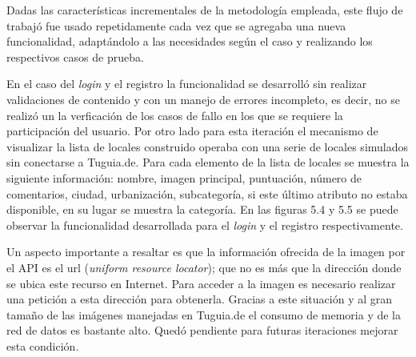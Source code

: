Dadas las características incrementales de la metodología empleada, este flujo de trabajó fue usado repetidamente cada vez que se agregaba una nueva funcionalidad, adaptándolo a las necesidades según el caso y realizando los respectivos casos de prueba.

En el caso del \textit{login} y el registro la funcionalidad se desarrolló sin realizar validaciones de contenido y con un manejo de errores incompleto, es decir, no se realizó un la verficación de los casos de fallo en los que se requiere la participación del usuario. Por otro lado para esta iteración el mecanismo de visualizar la lista de locales construido operaba con una serie de locales simulados sin conectarse a Tuguia.de. Para cada elemento de la lista de locales se muestra la siguiente información: nombre, imagen principal, puntuación, número de comentarios, ciudad, urbanización, subcategoría, si este último atributo no estaba disponible, en su lugar se muestra la categoría. En las figuras 5.4 y 5.5 se puede observar la funcionalidad desarrollada para el \textit{login} y el registro respectivamente.

Un aspecto importante a resaltar es que la información ofrecida de la imagen por el API es el url (\textit{uniform resource locator}); que no es más que la dirección donde se ubica este recurso en Internet. Para acceder a la imagen es necesario realizar una petición a esta dirección para obtenerla. Gracias a este situación y al gran tamaño de las imágenes manejadas en Tuguia.de el consumo de memoria y de la red de datos es bastante alto. Quedó pendiente para futuras iteraciones mejorar esta condición.
 

